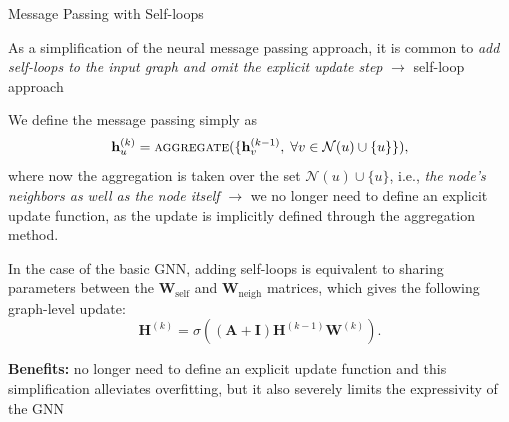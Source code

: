 \documentclass[10pt, aspectratio=169, compress, protectframetitle, handout]{beamer}
\begin{document}
\begin{frame}{Message Passing with Self-loops}

    As a simplification of the neural message passing approach, it is common to \emph{add self-loops to the input graph and omit the explicit update step} $\longrightarrow$ \alert{self-loop approach}
    \medskip
    
    We define the message passing simply as
    \begin{equation}
        \mathbf h^{(k)}_u = \textsc{aggregate}(\{\mathbf h_v^{(k-1)}, \; \forall v \in \mathcal N(u) \cup \{u\}\}),
    \end{equation}
    where now the aggregation is taken over the set $\mathcal N(u) \cup \{u\}$, i.e., \emph{the node's neighbors as well as the node itself} $\longrightarrow$ we no longer need to define an explicit update function, as the update is implicitly defined through the aggregation method.
    \medskip
    
    In the case of the basic GNN, adding self-loops is equivalent to  sharing parameters between the $\mathbf W_\text{self}$ and $\mathbf W_\text{neigh}$ matrices, which gives the following \alert{graph-level update}:
    \begin{equation}
        \mathbf H^{(k)} = \sigma \left( (\mathbf A + \mathbf I) \mathbf H^{(k-1)} \mathbf W^{(k)} \right) .
    \end{equation}
    
    \textbf{Benefits:} no longer need to define an explicit update function and this simplification \alert{alleviates overfitting}, but it also severely \alert{limits the expressivity} of the GNN

\end{frame}
\end{document}
